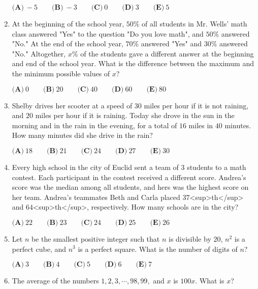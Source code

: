 \documentclass{article}
\begin{document}
\begin{enumerate}[label=\arabic*., itemsep=0.5em]
\(\textbf{(A)}\ -5 \qquad \textbf{(B)}\ -3 \qquad \textbf{(C)}\ 0 \qquad \textbf{(D)}\ 3 \qquad \textbf{(E)}\ 5\)\par \vspace{0.5em}\item At the beginning of the school year, \(50\%\) of all students in Mr. Wells' math class answered "Yes" to the question "Do you love math", and \(50\%\) answered "No." At the end of the school year, \(70\%\) answered "Yes" and \(30\%\) answered "No." Altogether, \(x\%\) of the students gave a different answer at the beginning and end of the school year. What is the difference between the maximum and the minimum possible values of \(x\)?

\(\textbf{(A)}\ 0 \qquad \textbf{(B)}\ 20 \qquad \textbf{(C)}\ 40 \qquad \textbf{(D)}\ 60 \qquad \textbf{(E)}\ 80\)\par \vspace{0.5em}\item Shelby drives her scooter at a speed of \(30\) miles per hour if it is not raining, and \(20\) miles per hour if it is raining. Today she drove in the sun in the morning and in the rain in the evening, for a total of \(16\) miles in \(40\) minutes. How many minutes did she drive in the rain?

\(\textbf{(A)}\ 18 \qquad \textbf{(B)}\ 21 \qquad \textbf{(C)}\ 24 \qquad \textbf{(D)}\ 27 \qquad \textbf{(E)}\ 30\)\par \vspace{0.5em}\item Every high school in the city of Euclid sent a team of \(3\) students to a math contest. Each participant in the contest received a different score. Andrea's score was the median among all students, and hers was the highest score on her team. Andrea's teammates Beth and Carla placed \(37\)<sup>th</sup> and \(64\)<sup>th</sup>, respectively. How many schools are in the city?

\(\textbf{(A)}\ 22 \qquad \textbf{(B)}\ 23 \qquad \textbf{(C)}\ 24 \qquad \textbf{(D)}\ 25 \qquad \textbf{(E)}\ 26\)\par \vspace{0.5em}\item Let \(n\) be the smallest positive integer such that \(n\) is divisible by \(20\), \(n^2\) is a perfect cube, and \(n^3\) is a perfect square. What is the number of digits of \(n\)?

\(\textbf{(A)}\ 3 \qquad \textbf{(B)}\ 4 \qquad \textbf{(C)}\ 5 \qquad \textbf{(D)}\ 6 \qquad \textbf{(E)}\ 7\)\par \vspace{0.5em}\item The average of the numbers \(1, 2, 3,\cdots, 98, 99,\) and \(x\) is \(100x\). What is \(x\)?


\end{enumerate}
\end{document}
